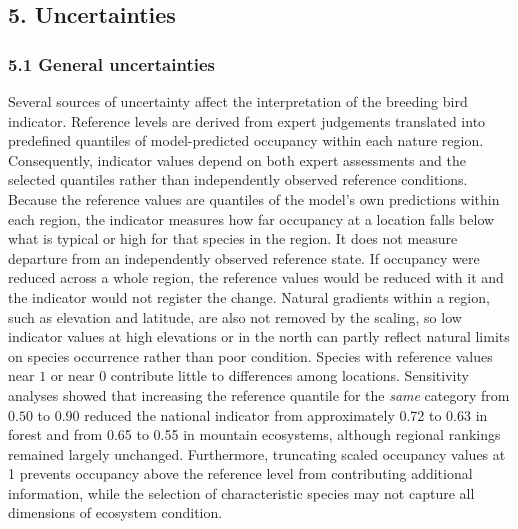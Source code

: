 \documentclass[
  letterpaper,
  DIV=11,
  numbers=noendperiod]{scrartcl}
\begin{document}
\subsection{5. Uncertainties}\label{sec-uncertainties}

\subsubsection{5.1 General uncertainties}\label{general-uncertainties}

Several sources of uncertainty affect the interpretation of the breeding
bird indicator. Reference levels are derived from expert judgements
translated into predefined quantiles of model-predicted occupancy within
each nature region. Consequently, indicator values depend on both expert
assessments and the selected quantiles rather than independently
observed reference conditions. Because the reference values are
quantiles of the model's own predictions within each region, the
indicator measures how far occupancy at a location falls below what is
typical or high for that species in the region. It does not measure
departure from an independently observed reference state. If occupancy
were reduced across a whole region, the reference values would be
reduced with it and the indicator would not register the change. Natural
gradients within a region, such as elevation and latitude, are also not
removed by the scaling, so low indicator values at high elevations or in
the north can partly reflect natural limits on species occurrence rather
than poor condition. Species with reference values near \(1\) or near
\(0\) contribute little to differences among locations. Sensitivity
analyses showed that increasing the reference quantile for the
\emph{same} category from \(0.50\) to \(0.90\) reduced the national
indicator from approximately 0.72 to 0.63 in forest and from 0.65 to
0.55 in mountain ecosystems, although regional rankings remained largely
unchanged. Furthermore, truncating scaled occupancy values at 1 prevents
occupancy above the reference level from contributing additional
information, while the selection of characteristic species may not
capture all dimensions of ecosystem condition.
\end{document}
